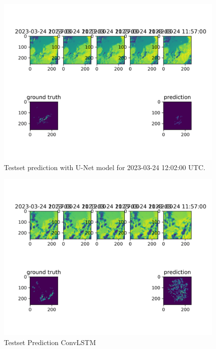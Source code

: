 \documentclass[acmtog, screen, balance]{acmart}
\begin{document}
\begin{figure}[hbp]
  \centering
  \includegraphics[width=500pt]{./images/experiment-0-unet.png}
  \caption{Testset prediction with U-Net model for 2023-03-24 12:02:00 UTC.}
  \Description{}
  \label{fig:unet}
\end{figure}

\begin{figure}[hbp]
  \centering
  \includegraphics[width=400pt]{./images/experiment-19.png}
  \caption{Testset Prediction ConvLSTM}
  \Description{}
  \label{fig:experiment-19}
\end{figure}
\end{document}
